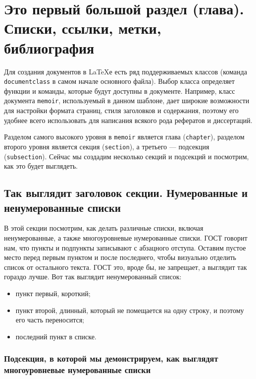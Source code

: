 \chapter{Это первый большой раздел (глава). Списки, ссылки, метки, библиография}
\label{ch:chap1}

    Для создания документов в \LaTeX{}е есть ряд поддерживаемых классов (команда \verb|documentclass| в самом начале основного файла). Выбор класса определяет функции и команды, которые будут доступны в документе. Например, класс документа \verb|memoir|, используемый в данном шаблоне, дает широкие возможности для настройки формата страниц, стиля заголовков и содержания, поэтому его удобнее всего использовать для написания всякого рода рефератов и диссертаций.

    Разделом самого высокого уровня в \verb|memoir| является глава (\verb|chapter|), разделом второго уровня является секция (\verb|section|), а третьего --- подсекция (\verb|subsection|). Сейчас мы создадим несколько секций и подсекций и посмотрим, как это будет выглядеть.

\section{Так выглядит заголовок секции. Нумерованные и ненумерованные списки}

    В этой секции посмотрим, как делать различные списки, включая ненумерованные, а также многоуровневые нумерованные списки. ГОСТ говорит нам, что пункты и подпункты записывают с абзацного отступа. Оставим пустое место перед первым пунктом и после последнего, чтобы визуально отделить список от остального текста. ГОСТ это, вроде бы, не запрещает, а выглядит так гораздо лучше. Вот так выглядит ненумерованный список:
    
    \begin{itemize}
        \item пункт первый, короткий;
        \item пункт второй, длинный, который не помещается на одну строку, и поэтому его часть переносится;
        \item последний пункт в списке.
    \end{itemize}
    
\subsection{Подсекция, в которой мы демонстрируем, как выглядят многоуровневые нумерованные списки}


